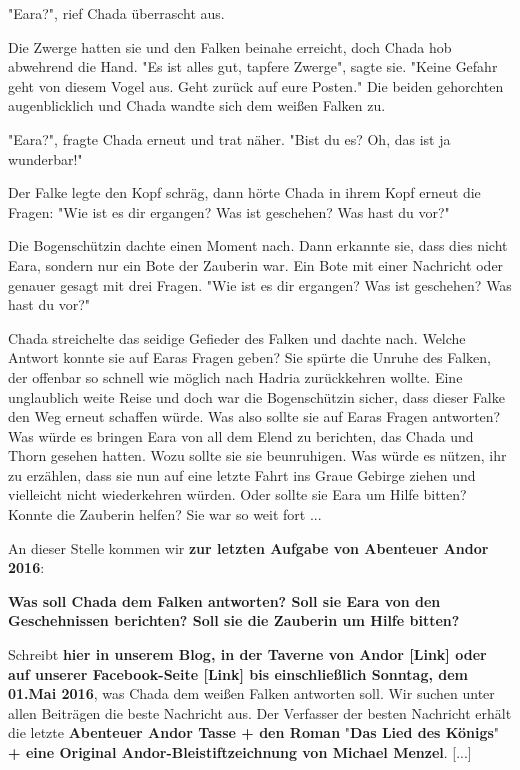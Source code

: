 \documentclass[10pt, a4paper, oneside]{book}
\begin{document}
\begin{multicols}{2}
"Eara?", rief Chada überrascht aus.

Die Zwerge hatten sie und den Falken beinahe erreicht, doch Chada hob abwehrend die Hand. "Es ist alles gut, tapfere Zwerge", sagte sie. "Keine Gefahr geht von diesem Vogel aus. Geht zurück auf eure Posten." Die beiden gehorchten augenblicklich und Chada wandte sich dem weißen Falken zu.

"Eara?", fragte Chada erneut und trat näher. "Bist du es? Oh, das ist ja wunderbar!"

Der Falke legte den Kopf schräg, dann hörte Chada in ihrem Kopf erneut die Fragen: "Wie ist es dir ergangen? Was ist geschehen? Was hast du vor?"

Die Bogenschützin dachte einen Moment nach. Dann erkannte sie, dass dies nicht Eara, sondern nur ein Bote der Zauberin war. Ein Bote mit einer Nachricht oder genauer gesagt mit drei Fragen. "Wie ist es dir ergangen? Was ist geschehen? Was hast du vor?"

Chada streichelte das seidige Gefieder des Falken und dachte nach. Welche Antwort konnte sie auf Earas Fragen geben? Sie spürte die Unruhe des Falken, der offenbar so schnell wie möglich nach Hadria zurückkehren wollte. Eine unglaublich weite Reise und doch war die Bogenschützin sicher, dass dieser Falke den Weg erneut schaffen würde. Was also sollte sie auf Earas Fragen antworten? Was würde es bringen Eara von all dem Elend zu berichten, das Chada und Thorn gesehen hatten. Wozu sollte sie sie beunruhigen. Was würde es nützen, ihr zu erzählen, dass sie nun auf eine letzte Fahrt ins Graue Gebirge ziehen und vielleicht nicht wiederkehren würden. Oder sollte sie Eara um Hilfe bitten? Konnte die Zauberin helfen? Sie war so weit fort ...

 

An dieser Stelle kommen wir \textbf{zur letzten Aufgabe von Abenteuer Andor 2016}:

\textbf{Was soll Chada dem Falken antworten? Soll sie Eara von den Geschehnissen berichten? Soll sie die Zauberin um Hilfe bitten?}


Schreibt\textbf{ hier in unserem Blog, in der Taverne von Andor [Link] oder auf unserer Facebook-Seite [Link] bis einschließlich Sonntag, dem 01.Mai 2016}, was Chada dem weißen Falken antworten soll. Wir suchen unter allen Beiträgen die beste Nachricht aus. Der Verfasser der besten Nachricht erhält die letzte \textbf{Abenteuer Andor Tasse + den Roman }"\textbf{Das Lied des Königs}"\textbf{ + eine Original Andor-Bleistiftzeichnung von Michael Menzel}. [...]


\end{multicols}
\end{document}
